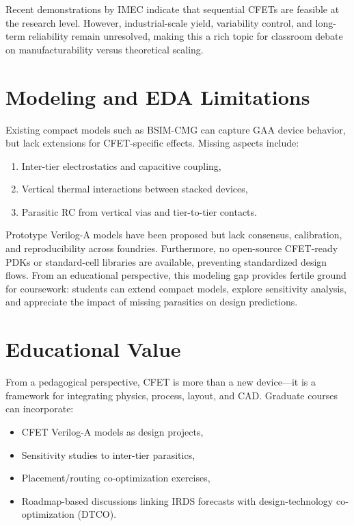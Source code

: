 \documentclass[conference]{IEEEtran}
\begin{document}
Recent demonstrations by IMEC indicate that sequential CFETs are
feasible at the research level. However, industrial-scale yield,
variability control, and long-term reliability remain unresolved,
making this a rich topic for classroom debate on manufacturability
versus theoretical scaling.

\section{Modeling and EDA Limitations}
Existing compact models such as BSIM-CMG can capture GAA device
behavior, but lack extensions for CFET-specific effects. Missing
aspects include:
\begin{enumerate}
  \item Inter-tier electrostatics and capacitive coupling,
  \item Vertical thermal interactions between stacked devices,
  \item Parasitic RC from vertical vias and tier-to-tier contacts.
\end{enumerate}

Prototype Verilog-A models have been proposed but lack consensus,
calibration, and reproducibility across foundries. Furthermore, no
open-source CFET-ready PDKs or standard-cell libraries are available,
preventing standardized design flows. From an educational
perspective, this modeling gap provides fertile ground for coursework:
students can extend compact models, explore sensitivity analysis, and
appreciate the impact of missing parasitics on design predictions.

\section{Educational Value}
From a pedagogical perspective, CFET is more than a new device—it is
a framework for integrating physics, process, layout, and CAD.
Graduate courses can incorporate:
\begin{itemize}
  \item CFET Verilog-A models as design projects,
  \item Sensitivity studies to inter-tier parasitics,
  \item Placement/routing co-optimization exercises,
  \item Roadmap-based discussions linking IRDS forecasts with
  design-technology co-optimization (DTCO).
\end{itemize}
\end{document}
